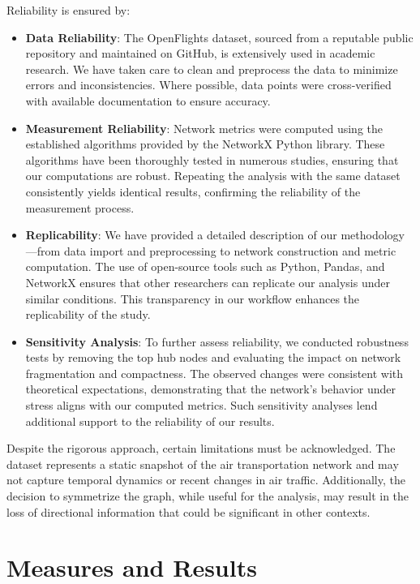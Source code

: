 \documentclass[12pt]{article}
\begin{document}
Reliability is ensured by:
\begin{itemize}
    \item \textbf{Data Reliability}: The OpenFlights dataset, sourced from a reputable public repository and maintained on GitHub, is extensively used in academic research. We have taken care to clean and preprocess the data to minimize errors and inconsistencies. Where possible, data points were cross-verified with available documentation to ensure accuracy.

    \item \textbf{Measurement Reliability}: Network metrics were computed using the established algorithms provided by the NetworkX Python library. These algorithms have been thoroughly tested in numerous studies, ensuring that our computations are robust. Repeating the analysis with the same dataset consistently yields identical results, confirming the reliability of the measurement process.

    \item \textbf{Replicability}: We have provided a detailed description of our methodology—from data import and preprocessing to network construction and metric computation. The use of open-source tools such as Python, Pandas, and NetworkX ensures that other researchers can replicate our analysis under similar conditions. This transparency in our workflow enhances the replicability of the study.

    \item \textbf{Sensitivity Analysis}: To further assess reliability, we conducted robustness tests by removing the top hub nodes and evaluating the impact on network fragmentation and compactness. The observed changes were consistent with theoretical expectations, demonstrating that the network's behavior under stress aligns with our computed metrics. Such sensitivity analyses lend additional support to the reliability of our results.

\end{itemize}

Despite the rigorous approach, certain limitations must be acknowledged. The dataset represents a static snapshot of the air transportation network and may not capture temporal dynamics or recent changes in air traffic. Additionally, the decision to symmetrize the graph, while useful for the analysis, may result in the loss of directional information that could be significant in other contexts.

\section{Measures and Results}
\end{document}
